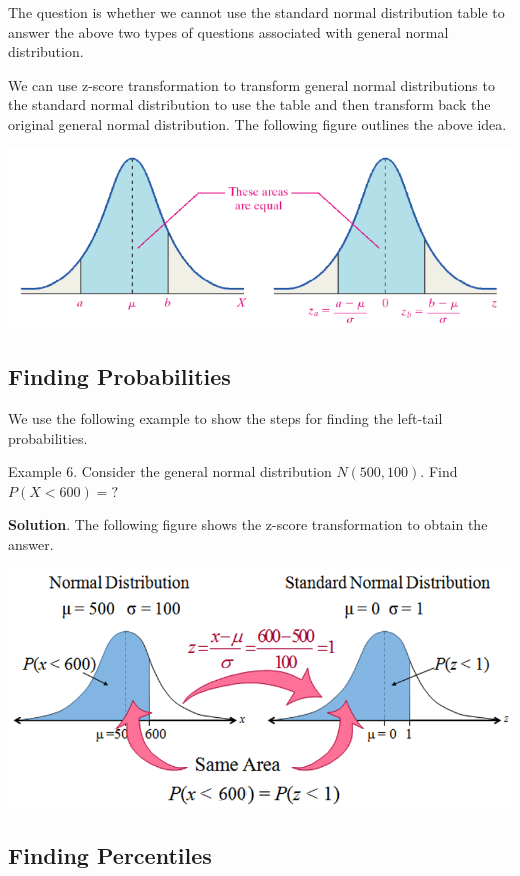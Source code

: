 \documentclass[
]{book}
\begin{document}
The question is whether we cannot use the standard normal distribution table to answer the above two types of questions associated with general normal distribution.

We can use z-score transformation to transform general normal distributions to the standard normal distribution to use the table and then transform back the original general normal distribution. The following figure outlines the above idea.

\begin{center}\includegraphics[width=0.6\linewidth]{week04/z-ScoreTranform} \end{center}

\hypertarget{finding-probabilities-1}{%
\subsection{Finding Probabilities}\label{finding-probabilities-1}}

We use the following example to show the steps for finding the left-tail probabilities.

Example 6. Consider the general normal distribution \(N(500, 100)\). Find \(P(X < 600) = ?\)

\textbf{Solution}. The following figure shows the z-score transformation to obtain the answer.

\begin{center}\includegraphics[width=0.6\linewidth]{week04/example06} \end{center}

\hypertarget{finding-percentiles-1}{%
\subsection{Finding Percentiles}\label{finding-percentiles-1}}
\end{document}
